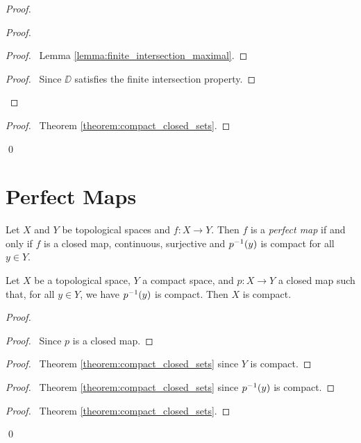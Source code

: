\begin{proof}
\begin{proof}
\begin{proof}
            \pf\ Lemma \ref{lemma:finite_intersection_maximal}.
        \end{proof}
        \begin{proof}
            \pf\ Since $\DD$ satisfies the finite intersection property.
        \end{proof}
    \end{proof}
    \qedstep
    \begin{proof}
        \pf\ Theorem \ref{theorem:compact_closed_sets}.
    \end{proof}
    \qed
\end{proof}

\section{Perfect Maps}

\begin{definition}
    Let $X$ and $Y$ be topological spaces and $f : X \rightarrow Y$. Then $f$ is a \emph{perfect map} if and only if $f$ is a closed map, continuous,
    surjective and ${p}^{-1}(y)$ is compact for all $y \in Y$.
\end{definition}

\begin{proposition}
    \label{proposition:compact_pre_image}
    Let $X$ be a topological space, $Y$ a compact space, and $p : X \rightarrow Y$ a closed map such that, for all $y \in Y$, we have ${p}^{-1}(y)$ is compact. Then $X$ is compact.
\end{proposition}

\begin{proof}
    \pf
    \begin{proof}
        \pf\ Since $p$ is a closed map.
    \end{proof}
    \begin{proof}
        \pf\ Theorem \ref{theorem:compact_closed_sets} since $Y$ is compact.
    \end{proof}
    \begin{proof}
        \pf\ Theorem \ref{theorem:compact_closed_sets} since ${p}^{-1}(y)$ is compact.
    \end{proof}
    \qedstep
    \begin{proof}
        \pf\ Theorem \ref{theorem:compact_closed_sets}.
    \end{proof}
    \qed
\end{proof}
